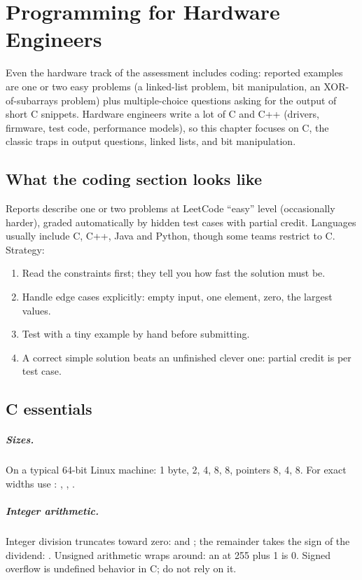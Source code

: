 \chapter{Programming for Hardware Engineers}
\label{ch:prog}

Even the hardware track of the assessment includes coding: reported examples are one or two easy problems (a linked-list problem, bit manipulation, an XOR-of-subarrays problem) plus multiple-choice questions asking for the output of short C snippets. Hardware engineers write a lot of C and C++ (drivers, firmware, test code, performance models), so this chapter focuses on C, the classic traps in output questions, linked lists, and bit manipulation.

\section{What the coding section looks like}

Reports describe one or two problems at LeetCode ``easy'' level (occasionally harder), graded automatically by hidden test cases with partial credit. Languages usually include C, C++, Java and Python, though some teams restrict to C. Strategy:
\begin{enumerate}
  \item Read the constraints first; they tell you how fast the solution must be.
  \item Handle edge cases explicitly: empty input, one element, zero, the largest values.
  \item Test with a tiny example by hand before submitting.
  \item A correct simple solution beats an unfinished clever one: partial credit is per test case.
\end{enumerate}

\section{C essentials}

\paragraph{Sizes.} On a typical 64-bit Linux machine:  1 byte,  2,  4,  8,  8, pointers 8,  4,  8. For exact widths use : , , .

\paragraph{Integer arithmetic.} Integer division truncates toward zero:  and ; the remainder takes the sign of the dividend: . Unsigned arithmetic wraps around: an  at 255 plus 1 is 0. Signed overflow is undefined behavior in C; do not rely on it.

